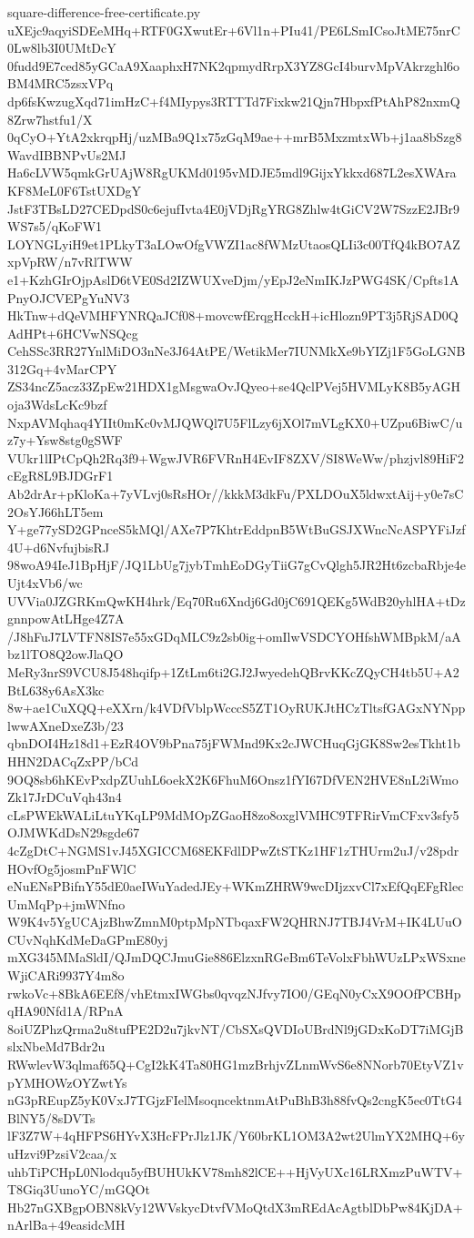 \documentclass[11pt]{article}
\theoremstyle{definition}
\theoremstyle{remark}
\begin{document}
\begin{filecontents*}[overwrite]{square-difference-free-certificate.py}
uXEjc9aqyiSDEeMHq+RTF0GXwutEr+6Vl1n+PIu41/PE6LSmICsoJtME75nrC0Lw8lb3I0UMtDcY
0fudd9E7ced85yGCaA9XaaphxH7NK2qpmydRrpX3YZ8GcI4burvMpVAkrzghl6oBM4MRC5zsxVPq
dp6fsKwzugXqd71imHzC+f4MIypys3RTTTd7Fixkw21Qjn7HbpxfPtAhP82nxmQ8Zrw7hstfu1/X
0qCyO+YtA2xkrqpHj/uzMBa9Q1x75zGqM9ae++mrB5MxzmtxWb+j1aa8bSzg8WavdIBBNPvUs2MJ
Ha6cLVW5qmkGrUAjW8RgUKMd0195vMDJE5mdl9GijxYkkxd687L2esXWAraKF8MeL0F6TstUXDgY
JstF3TBsLD27CEDpdS0c6ejufIvta4E0jVDjRgYRG8Zhlw4tGiCV2W7SzzE2JBr9WS7s5/qKoFW1
LOYNGLyiH9et1PLkyT3aLOwOfgVWZI1ac8fWMzUtaosQLIi3c00TfQ4kBO7AZxpVpRW/n7vRlTWW
e1+KzhGIrOjpAslD6tVE0Sd2IZWUXveDjm/yEpJ2eNmIKJzPWG4SK/Cpfts1APnyOJCVEPgYuNV3
HkTnw+dQeVMHFYNRQaJCf08+movcwfErqgHcckH+icHlozn9PT3j5RjSAD0QAdHPt+6HCVwNSQcg
CehSSc3RR27YnlMiDO3nNe3J64AtPE/WetikMer7IUNMkXe9bYIZj1F5GoLGNB312Gq+4vMarCPY
ZS34ncZ5acz33ZpEw21HDX1gMsgwaOvJQyeo+se4QclPVej5HVMLyK8B5yAGHoja3WdsLcKc9bzf
NxpAVMqhaq4YIIt0mKc0vMJQWQl7U5FlLzy6jXOl7mVLgKX0+UZpu6BiwC/uz7y+Ysw8stg0gSWF
VUkr1lIPtCpQh2Rq3f9+WgwJVR6FVRnH4EvIF8ZXV/SI8WeWw/phzjvl89HiF2cEgR8L9BJDGrF1
Ab2drAr+pKloKa+7yVLvj0sRsHOr//kkkM3dkFu/PXLDOuX5ldwxtAij+y0e7sC2OsYJ66hLT5em
Y+ge77ySD2GPnceS5kMQl/AXe7P7KhtrEddpnB5WtBuGSJXWncNcASPYFiJzf4U+d6NvfujbisRJ
98woA94IeJ1BpHjF/JQ1LbUg7jybTmhEoDGyTiiG7gCvQlgh5JR2Ht6zcbaRbje4eUjt4xVb6/wc
UVVia0JZGRKmQwKH4hrk/Eq70Ru6Xndj6Gd0jC691QEKg5WdB20yhlHA+tDzgnnpowAtLHge4Z7A
/J8hFuJ7LVTFN8IS7e55xGDqMLC9z2sb0ig+omIlwVSDCYOHfshWMBpkM/aAbz1lTO8Q2owJlaQO
MeRy3nrS9VCU8J548hqifp+1ZtLm6ti2GJ2JwyedehQBrvKKcZQyCH4tb5U+A2BtL638y6AsX3kc
8w+ae1CuXQQ+eXXrn/k4VDfVblpWcccS5ZT1OyRUKJtHCzTltsfGAGxNYNpplwwAXneDxeZ3b/23
qbnDOI4Hz18d1+EzR4OV9bPna75jFWMnd9Kx2cJWCHuqGjGK8Sw2esTkht1bHHN2DACqZxPP/bCd
9OQ8sb6hKEvPxdpZUuhL6oekX2K6FhuM6Onsz1fYI67DfVEN2HVE8nL2iWmoZk17JrDCuVqh43n4
cLsPWEkWALiLtuYKqLP9MdMOpZGaoH8zo8oxglVMHC9TFRirVmCFxv3sfy5OJMWKdDsN29sgde67
4cZgDtC+NGMS1vJ45XGICCM68EKFdlDPwZtSTKz1HF1zTHUrm2uJ/v28pdrHOvfOg5josmPnFWlC
eNuENsPBifnY55dE0aeIWuYadedJEy+WKmZHRW9wcDIjzxvCl7xEfQqEFgRlecUmMqPp+jmWNfno
W9K4v5YgUCAjzBhwZmnM0ptpMpNTbqaxFW2QHRNJ7TBJ4VrM+IK4LUuOCUvNqhKdMeDaGPmE80yj
mXG345MMaSldI/QJmDQCJmuGie886ElzxnRGeBm6TeVolxFbhWUzLPxWSxneWjiCARi9937Y4m8o
rwkoVc+8BkA6EEf8/vhEtmxIWGbs0qvqzNJfvy7IO0/GEqN0yCxX9OOfPCBHpqHA90Nfd1A/RPnA
8oiUZPhzQrma2u8tufPE2D2u7jkvNT/CbSXsQVDIoUBrdNl9jGDxKoDT7iMGjBslxNbeMd7Bdr2u
RWwlevW3qlmaf65Q+CgI2kK4Ta80HG1mzBrhjvZLnmWvS6e8NNorb70EtyVZ1vpYMHOWzOYZwtYs
nG3pREupZ5yK0VxJ7TGjzFIelMsoqncektnmAtPuBhB3h88fvQs2cngK5ec0TtG4BlNY5/8sDVTs
lF3Z7W+4qHFPS6HYvX3HcFPrJlz1JK/Y60brKL1OM3A2wt2UlmYX2MHQ+6yuHzvi9PzsiV2caa/x
uhbTiPCHpL0Nlodqu5yfBUHUkKV78mh82lCE++HjVyUXc16LRXmzPuWTV+T8Giq3UunoYC/mGQOt
Hb27nGXBgpOBN8kVy12WVskycDtvfVMoQtdX3mREdAcAgtblDbPw84KjDA+nArlBa+49easidcMH

\end{filecontents*}
\end{document}
